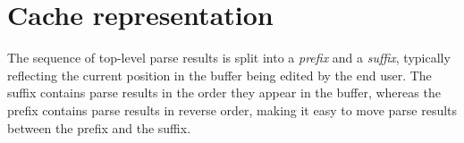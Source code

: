 \section{Cache representation}

The sequence of top-level parse results is split into a \emph{prefix}
and a \emph{suffix}, typically reflecting the current position in the
buffer being edited by the end user.  The suffix contains parse
results in the order they appear in the buffer, whereas the prefix
contains parse results in reverse order, making it easy to move parse
results between the prefix and the suffix.
